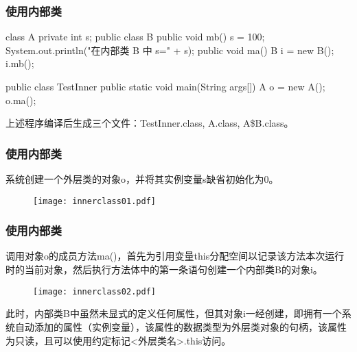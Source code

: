 \begin{frame}[fragile] %
\frametitle{使用内部类}


\begin{javaCode}
class A {
  private int s;
  public class B {
    public void mb() {
      s = 100;
      System.out.println("在内部类 B 中 s=" + s);
    }
  }
  public void ma() {
    B i = new B();
    i.mb();
  }
}

public class TestInner {
  public static void main(String args[]) {
    A o = new A();
    o.ma();
  }
}
\end{javaCode}

{\small \Mage 上述程序编译后生成三个文件：TestInner.class, A.class, A\$B.class。}
\end{frame}

\begin{frame}[fragile] %
\frametitle{使用内部类}


系统创建一个外层类的对象o，并将其实例变量s缺省初始化为0。

\begin{figure}
\centering
\texttt{[image: innerclass01.pdf]}
\end{figure}

\end{frame}

\begin{frame}[fragile] %
\frametitle{使用内部类}


调用对象o的成员方法ma()，首先为引用变量this分配空间以记录该方法本次运行时的当前对象，然后执行方法体中的第一条语句创建一个内部类B的对象i。

\begin{figure}
\centering
\texttt{[image: innerclass02.pdf]}
\end{figure}

{\kai\small 此时，内部类B中虽然未显式的定义任何属性，但其对象i一经创建，即拥有一个系统自动添加的属性（实例变量），该属性的数据类型为外层类对象的句柄，该属性为只读，且可以使用约定标记<外层类名>.this访问。}

\end{frame}

